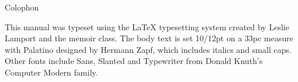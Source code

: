 \documentclass[10pt,letterpaper,extrafontsizes]{memoir}
\begin{document}

\printindex



\cleardoublepage
\pagestyle{empty}
\null\vfil

\begin{adjustwidth}{1in}{1in}
\begin{center}
{\Large\textsf{Colophon}}
\end{center}
\begin{center}
This manual was typeset using the LaTeX typesetting system
created by Leslie Lamport and the memoir class. 
The body text is set 10/12pt on a
33pc measure with Palatino designed by Hermann Zapf, which includes 
italics and small caps. Other fonts include
Sans, Slanted and Typewriter from Donald Knuth's 
Computer Modern family.

\end{center}

\end{adjustwidth}

\vfil
\end{document}
